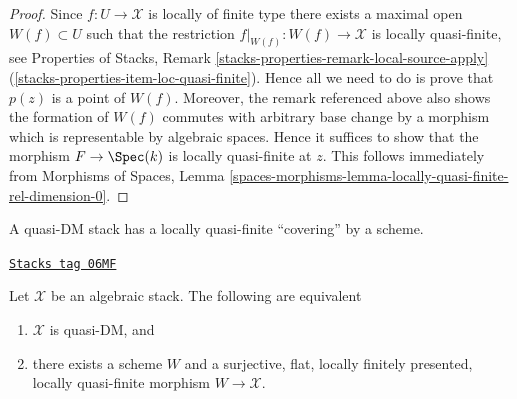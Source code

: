 \begin{proof}
Since $f : U \to \mathcal{X}$ is locally of finite type there exists a
maximal open $W(f) \subset U$ such that the restriction
$f|_{W(f)} : W(f) \to \mathcal{X}$ is locally quasi-finite, see
Properties of Stacks, Remark
\ref{stacks-properties-remark-local-source-apply}
(\ref{stacks-properties-item-loc-quasi-finite}).
Hence all we need to do is prove that $p(z)$ is a point of $W(f)$.
Moreover, the remark referenced above also shows the formation of $W(f)$
commutes with arbitrary base change by a morphism which is representable
by algebraic spaces. Hence it suffices to show that the morphism
$F \to \Spec(k)$ is locally quasi-finite at $z$. This follows
immediately from
Morphisms of Spaces,
Lemma \ref{spaces-morphisms-lemma-locally-quasi-finite-rel-dimension-0}.
\end{proof}

A quasi-DM stack has a locally quasi-finite ``covering'' by a scheme.

\begin{theorem}[Quasi DM]
\label{stacks-morphisms-theorem-quasi-DM}
\href{https://stacks.math.columbia.edu/tag/06MF}{\texttt{Stacks tag 06MF}}

Let $\mathcal{X}$ be an algebraic stack. The following are equivalent
\begin{enumerate}
\item $\mathcal{X}$ is quasi-DM, and
\item there exists a scheme $W$ and a surjective, flat, locally finitely
presented, locally quasi-finite morphism $W \to \mathcal{X}$.
\end{enumerate}
\end{theorem}


